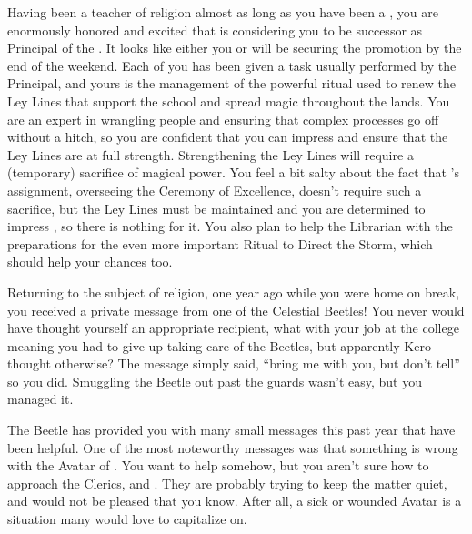 \documentclass[char]{GL2020}
\begin{document}
Having been a teacher of religion almost as long as you have been a \cBeetle{\cleric}, you are enormously honored and excited that \cPrincipal{} is considering you to be \cPrincipal{\their} successor as Principal of the \pSchool{}. It looks like either you or \cMusic{} will be securing the promotion by the end of the weekend. Each of you has been given a task usually performed by the Principal, and yours is the management of the powerful ritual used to renew the Ley Lines that support the school and spread magic throughout the lands. You are an expert in wrangling people and ensuring that complex processes go off without a hitch, so you are confident that you can impress \cPrincipal{} and ensure that the Ley Lines are at full strength. Strengthening the Ley Lines will require a (temporary) sacrifice of magical power. You feel a bit salty about the fact that \cMusic{}'s assignment, overseeing the Ceremony of Excellence, doesn't require such a sacrifice, but the Ley Lines must be maintained and you are determined to impress \cPrincipal{}, so there is nothing for it. You also plan to help the Librarian with the preparations for the even more important Ritual to Direct the Storm, which should help your chances too.

Returning to the subject of religion, one year ago while you were home on break, you received a private message from one of the Celestial Beetles! You never would have thought yourself an appropriate recipient, what with your job at the college meaning you had to give up taking care of the Beetles, but apparently Kero thought otherwise? The message simply said, ``bring me with you, but don't tell'' so you did. Smuggling the Beetle out past the guards wasn't easy, but you managed it. 

The Beetle has provided you with many small messages this past year that have been helpful. One of the most noteworthy messages was that something is wrong with the Avatar of \cEbbFull{\full}. You want to help somehow, but you aren't sure how to approach the \pShip{} Clerics, \cEbbPriest{\full} and \cFlowPriest{\full}. They are probably trying to keep the matter quiet, and would not be pleased that you know. After all, a sick or wounded Avatar is a situation many would love to capitalize on.
\end{document}
